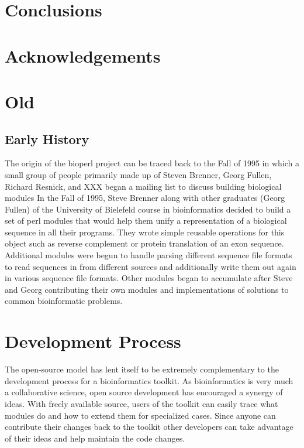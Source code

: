 \documentclass{article}
\begin{document}
\begin{twocolumn}
\section{Conclusions}

\section{Acknowledgements}

\section{Old}


\subsection{Early History}

The origin of the bioperl project can be traced back to the Fall of
1995 in which a small group of people primarily made up of Steven
Brenner, Georg Fullen, Richard Resnick, and XXX began a mailing list
\cite{oldbioperlmaillist} to discuss building biological modules 
In the Fall of 1995, Steve Brenner along with other graduates (Georg
Fullen) of the University of Bielefeld course in bioinformatics
decided to build a set of perl modules that would help them unify a
representation of a biological sequence in all their programs.  They
wrote simple reusable operations for this object such as reverse
complement or protein translation of an exon sequence.  Additional
modules were begun to handle parsing different sequence file formats
to read sequences in from different sources and additionally write
them out again in various sequence file formats.  Other modules began
to accumulate after Steve and Georg contributing their own modules and
implementations of solutions to common bioinformatic problems.


\section{Development Process}

The open-source model has lent itself to be extremely complementary to
the development process for a bioinformatics toolkit.  As
bioinformatics is very much a collaborative science, open source
development has encouraged a synergy of ideas.  With freely available
source, users of the toolkit can easily trace what modules do and how
to extend them for specialized cases.  Since anyone can contribute
their changes back to the toolkit other developers can take advantage
of their ideas and help maintain the code changes. 


\end{twocolumn}
\end{document}
